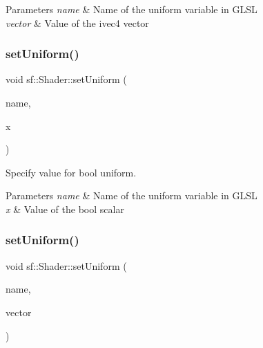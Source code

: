 \begin{DoxyParams}{Parameters}
{\em name} & Name of the uniform variable in G\+L\+SL \\
\hline
{\em vector} & Value of the ivec4 vector \\
\hline
\end{DoxyParams}
\mbox{\label{classsf_1_1_shader_af417027ac72c06e6cfbf30975cd678e9}} 
\subsubsection{\texorpdfstring{set\+Uniform()}{setUniform()}\hspace{0.1cm}{\footnotesize\ttfamily [9/16]}}
{\footnotesize\ttfamily void sf\+::\+Shader\+::set\+Uniform (\begin{DoxyParamCaption}\item[{const std\+::string \&}]{name,  }\item[{bool}]{x }\end{DoxyParamCaption})}



Specify value for {\ttfamily bool} uniform. 


\begin{DoxyParams}{Parameters}
{\em name} & Name of the uniform variable in G\+L\+SL \\
\hline
{\em x} & Value of the bool scalar \\
\hline
\end{DoxyParams}
\mbox{\label{classsf_1_1_shader_ab2518b8dd0762e682b452a5d5005f2bf}} 
\subsubsection{\texorpdfstring{set\+Uniform()}{setUniform()}\hspace{0.1cm}{\footnotesize\ttfamily [10/16]}}
{\footnotesize\ttfamily void sf\+::\+Shader\+::set\+Uniform (\begin{DoxyParamCaption}\item[{const std\+::string \&}]{name,  }\item[{const \hyperlink{namespacesf_1_1_glsl_a59d8cf909c3d71ebf3db057480b464da}{Glsl\+::\+Bvec2} \&}]{vector }\end{DoxyParamCaption})}




